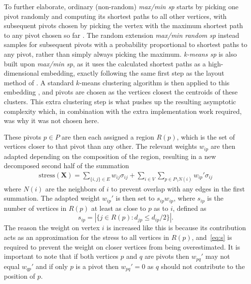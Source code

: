 To further elaborate, ordinary (non-random) \emph{max/min sp} starts by picking one pivot randomly and computing its shortest paths to all other vertices, with subsequent pivots chosen by picking the vertex with the maximum shortest path to any pivot chosen so far \citep{DeSilva2004}. The random extension \emph{max/min random sp} instead samples for subsequent pivots with a probability proportional to shortest paths to any pivot, rather than simply always picking the maximum.
\emph{k-means sp} is also built upon \emph{max/min sp}, as it uses the calculated shortest paths as a high-dimensional embedding, exactly following the same first step as the layout method of \citet{Harel2004}. A standard $k$-means clustering algorithm is then applied to this embedding \citep{Friedman2001Nearest}, and pivots are chosen as the vertices closest the centroids of these clusters.
This extra clustering step is what pushes up the resulting asymptotic complexity \citep{Ortmann2017} which, in combination with the extra implementation work required, was why it was not chosen here.

These pivots $p\in P$ are then each assigned a region $R(p)$, which is the set of vertices closer to that pivot than any other. The relevant weights $w_{ip}$ are then adapted depending on the composition of the region, resulting in a new decomposed second half of the summation
\begin{equation}
  \begin{split}
  \text{stress}(\mathbf{X}) = \sum_{\{i,j\}\in E}w_{ij}\sigma_{ij}
  + \sum_{i\in V}\sum_{p\in P\setminus N(i)}w_{ip}'\sigma_{ij}
  \end{split}
  \label{eq:pivot_stress}
\end{equation}
where $N(i)$ are the neighbors of $i$ to prevent overlap with any edges in the first summation.
The adapted weight $w_{ip}'$ is then set to $s_{ip} w_{ip}$, where $s_{ip}$ is the number of vertices in $R(p)$ at least as close to $p$ as to $i$, defined as
\begin{equation}
  s_{ip}=|\{j\in R(p): d_{jp} \leq d_{ip}/2\}|.
  \label{eq:s}
\end{equation}
The reason the weight on vertex $i$ is increased like this is because its contribution acts as an approximation for the stress to all vertices in $R(p)$, and~\eqref{eq:s} is required to prevent the weight on closer vertices from being overestimated.
It is important to note that if both vertices $p$ and $q$ are pivots then $w_{pq}'$ may not equal $w_{qp}'$ and if only $p$ is a pivot then $w_{pq}'=0$ as $q$ should not contribute to the position of $p$.


